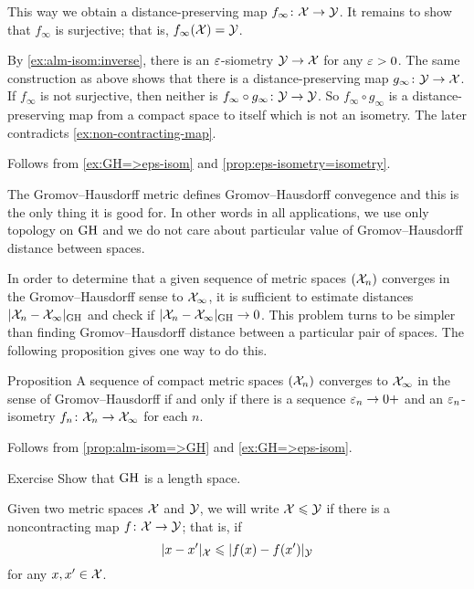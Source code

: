 This way we obtain a distance-preserving map $f_\infty\colon\mathcal{X}\to \mathcal{Y}$. 
It remains to show that $f_\infty$ is surjective; that is, $f_\infty(\mathcal{X})=\mathcal{Y}$.

By \ref{ex:alm-isom:inverse}, there is an $\varepsilon$-siometry $\spc{Y}\z\to \spc{X}$ for any $\varepsilon>0$.
The same construction as above shows that there is a distance-preserving map $g_\infty\:\spc{Y}\z\to \spc{X}$.
If $f_\infty$ is not surjective, then neither is $f_\infty\circ g_\infty\colon\mathcal{Y}\to \mathcal{Y}$.
So $f_\infty \circ g_\infty$ is a distance-preserving map from a compact space to itself which is not an isometry.
The later contradicts \ref{ex:non-contracting-map}. 
\qeds

Follows from \ref{ex:GH=>eps-isom} and \ref{prop:eps-isometry=isometry}.
\qeds


The Gromov--Hausdorff metric defines Gromov--Hausdorff convegence
and this is the only thing it is good for.
In other words in all applications, we use only topology on $\operatorname{\rm GH}\nolimits$
and we do not care about particular value of Gromov--Hausdorff distance between spaces.

In order to determine that a given sequence of metric spaces $(\mathcal{X}_n)$ converges in the Gromov--Hausdorff sense to $\mathcal{X}_\infty$, it is sufficient to estimate distances $|\mathcal{X}_n-\mathcal{X}_\infty|_{\operatorname{\rm GH}\nolimits}$ and  check if $|\mathcal{X}_n-\mathcal{X}_\infty|_{\operatorname{\rm GH}\nolimits}\to 0$.
This problem turns to be simpler than finding Gromov--Hausdorff distance between a particular pair of spaces.
The following proposition gives one way to do this.

\begin{thm}{Proposition}\label{prop:GH-e-isom}
A sequence of compact metric spaces $(\mathcal{X}_n)$ converges to  $\mathcal{X}_\infty$ in the sense of Gromov--Hausdorff if and only if there is a sequence $\varepsilon_n\to0+$
and an $\varepsilon_n$-isometry $f_n\colon\mathcal{X}_n\to \mathcal{X}_\infty$ for each $n$.
\end{thm}

 Follows from \ref{prop:alm-isom=>GH} and \ref{ex:GH=>eps-isom}.
\qeds

\begin{thm}{Exercise}
Show that $\operatorname{\rm GH}\nolimits$ is a length space.
\end{thm}

Given two metric spaces $\mathcal{X}$ and $\mathcal{Y}$, we will write $\mathcal{X}\leqslant \mathcal{Y}$ if there is a noncontracting map $f\colon\mathcal{X}\to \mathcal{Y}$;
that is, if 
$$ |x-x'|_{\mathcal{X}}\leqslant|f(x)-f(x')|_{\mathcal{Y}}$$
for any $x,x'\in \mathcal{X}$.

